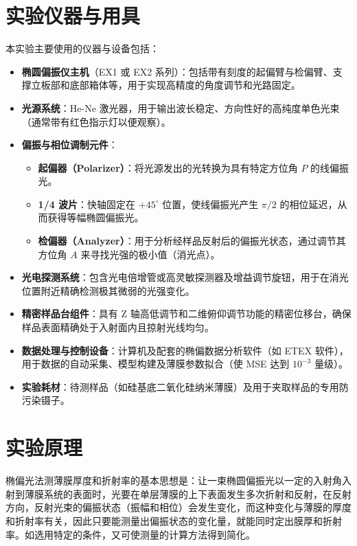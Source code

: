 \documentclass[11pt]{article}
\begin{document}
\section{实验仪器与用具}
本实验主要使用的仪器与设备包括：
\begin{itemize}
    \item \textbf{椭圆偏振仪主机}（EX1 或 EX2 系列）：包括带有刻度的起偏臂与检偏臂、支撑立板部和底部箱体等，用于实现高精度的角度调节和光路固定。
    \item \textbf{光源系统}：He-Ne 激光器，用于输出波长稳定、方向性好的高纯度单色光束（通常带有红色指示灯以便观察）。
    \item \textbf{偏振与相位调制元件}：
    \begin{itemize}
        \item \textbf{起偏器（Polarizer）}：将光源发出的光转换为具有特定方位角 $P$ 的线偏振光。
        \item \textbf{1/4 波片}：快轴固定在 $+45^\circ$ 位置，使线偏振光产生 $\pi/2$ 的相位延迟，从而获得等幅椭圆偏振光。
        \item \textbf{检偏器（Analyzer）}：用于分析经样品反射后的偏振光状态，通过调节其方位角 $A$ 来寻找光强的极小值（消光点）。
    \end{itemize}
    \item \textbf{光电探测系统}：包含光电倍增管或高灵敏探测器及增益调节旋钮，用于在消光位置附近精确检测极其微弱的光强变化。
    \item \textbf{精密样品台组件}：具有 Z 轴高低调节和二维俯仰调节功能的精密位移台，确保样品表面精确处于入射面内且掠射光线均匀。
    \item \textbf{数据处理与控制设备}：计算机及配套的椭偏数据分析软件（如 ETEX 软件），用于数据的自动采集、模型构建及薄膜参数拟合（使 MSE 达到 $10^{-3}$ 量级）。
    \item \textbf{实验耗材}：待测样品（如硅基底二氧化硅纳米薄膜）及用于夹取样品的专用防污染镊子。
\end{itemize}

\section{实验原理}
椭偏光法测薄膜厚度和折射率的基本思想是：让一束椭圆偏振光以一定的入射角入射到薄膜系统的表面时，光要在单层薄膜的上下表面发生多次折射和反射，在反射方向，反射光束的偏振状态（振幅和相位）会发生变化，而这种变化与薄膜的厚度和折射率有关，因此只要能测量出偏振状态的变化量，就能同时定出膜厚和折射率。如选用特定的条件，又可使测量的计算方法得到简化。
\end{document}
